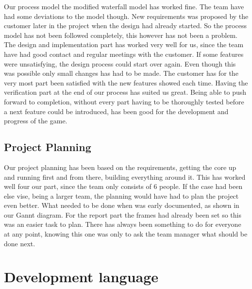 Our process model the modified waterfall model has worked fine. The team have had some  deviations to the model though. New requirements was proposed by the customer later in the project when the design had already started. So the process model has not been followed completely, this however has not been a problem. The design  and implementation part has worked very well for us, since the team have had good contact and regular meetings with the customer. If some features were unsatisfying, the design process could start over again. Even though this was possible only small changes has had to be made. The customer has for the very most part been satisfied with the new features showed each time. Having the verification part at the end of our process has suited us great. Being able to push forward to completion, without every part having to be thoroughly tested before a next feature could be introduced, has been good for the development and progress of the game. 
\subsection{Project Planning}

Our project planning has been based on the requirements, getting the core up and running first and from there, building everything around it. This has worked well four our part, since the team only consists of 6 people. If the case had been else vise, being a larger team, the planning would have had to plan the project even better. What needed to be done when was early documented, as shown in our Gannt diagram. For the report part the frames had already been set so this was an easier task to plan. There has always been something to do for everyone at any point, knowing this one was only to ask the team manager what should be done next.


\section{Development language}

